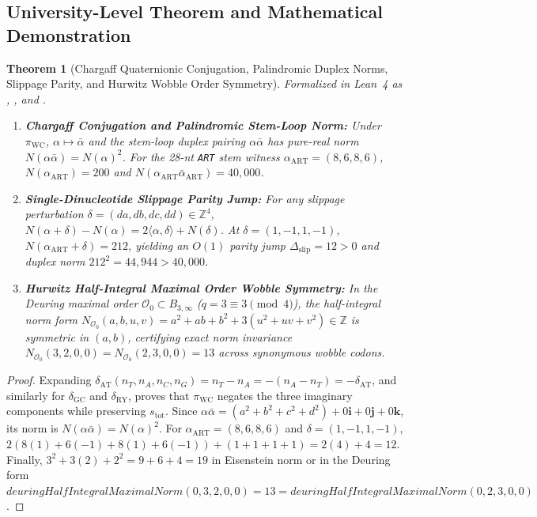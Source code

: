 \documentclass[11pt,a4paper]{article}
\newtheorem{theorem}{Theorem}[section]
\theoremstyle{definition}
\theoremstyle{remark}
\begin{document}
\subsection{University-Level Theorem and Mathematical Demonstration}

\begin{theorem}[Chargaff Quaternionic Conjugation, Palindromic Duplex Norms, Slippage Parity, and Hurwitz Wobble Order Symmetry]
\label{thm:sec6_quaternions_hurwitz}
Formalized in Lean~4 as , , and .
\begin{enumerate}
  \item \textbf{Chargaff Conjugation and Palindromic Stem-Loop Norm:} Under $\pi_{\mathrm{WC}}$, $\alpha \mapsto \bar{\alpha}$ and the stem-loop duplex pairing $\alpha\bar{\alpha}$ has pure-real norm $N(\alpha\bar{\alpha}) = N(\alpha)^2$. For the 28-nt \texttt{ART} stem witness $\alpha_{\mathrm{ART}} = (8, 6, 8, 6)$, $N(\alpha_{\mathrm{ART}}) = 200$ and $N(\alpha_{\mathrm{ART}}\bar{\alpha}_{\mathrm{ART}}) = 40{,}000$.
  \item \textbf{Single-Dinucleotide Slippage Parity Jump:} For any slippage perturbation $\delta = (da, db, dc, dd) \in \mathbb{Z}^4$, $N(\alpha + \delta) - N(\alpha) = 2\langle\alpha,\delta\rangle + N(\delta)$. At $\delta = (1, -1, 1, -1)$, $N(\alpha_{\mathrm{ART}} + \delta) = 212$, yielding an $O(1)$ parity jump $\Delta_{\mathrm{slip}} = 12 > 0$ and duplex norm $212^2 = 44{,}944 > 40{,}000$.
  \item \textbf{Hurwitz Half-Integral Maximal Order Wobble Symmetry:} In the Deuring maximal order $\mathcal{O}_0 \subset B_{3,\infty}$ ($q = 3 \equiv 3 \pmod 4$), the half-integral norm form $N_{\mathcal{O}_0}(a,b,u,v) = a^2 + ab + b^2 + 3(u^2 + uv + v^2) \in \mathbb{Z}$ is symmetric in $(a,b)$, certifying exact norm invariance $N_{\mathcal{O}_0}(3,2,0,0) = N_{\mathcal{O}_0}(2,3,0,0) = 13$ across synonymous wobble codons.
\end{enumerate}
\end{theorem}

\begin{proof}
Expanding $\delta_{\mathrm{AT}}(n_T, n_A, n_C, n_G) = n_T - n_A = -(n_A - n_T) = -\delta_{\mathrm{AT}}$, and similarly for $\delta_{\mathrm{GC}}$ and $\delta_{\mathrm{RY}}$, proves that $\pi_{\mathrm{WC}}$ negates the three imaginary components while preserving $s_{\mathrm{tot}}$. Since $\alpha\bar{\alpha} = (a^2+b^2+c^2+d^2) + 0\mathbf{i} + 0\mathbf{j} + 0\mathbf{k}$, its norm is $N(\alpha\bar{\alpha}) = N(\alpha)^2$. For $\alpha_{\mathrm{ART}} = (8,6,8,6)$ and $\delta = (1,-1,1,-1)$, $2(8(1) + 6(-1) + 8(1) + 6(-1)) + (1+1+1+1) = 2(4) + 4 = 12$. Finally, $3^2 + 3(2) + 2^2 = 9 + 6 + 4 = 19$ in Eisenstein norm or in the Deuring form $deuringHalfIntegralMaximalNorm(0,3,2,0,0) = 13 = deuringHalfIntegralMaximalNorm(0,2,3,0,0)$.
\end{proof}
\end{document}
